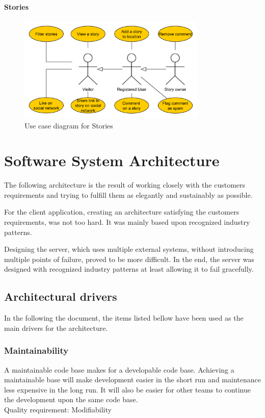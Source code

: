 \documentclass[11pt]{book}
\begin{document}
\subsubsection{Stories}
\begin{figure}[H]
      \centering
      \includegraphics[width=0.8\textwidth]{Figures/Requirements/story.pdf}
      \caption{Use case diagram for Stories}
      \label{fig:req_usecase_stories}
\end{figure}


\chapter{Software System Architecture}\label{chap:architecture}
The following architecture is the result of working closely with the customers requirements and trying to fulfill them as elegantly and sustainably as possible.

For the client application, creating an architecture satisfying the customers requirements, was not too hard. It was  mainly based upon recognized industry patterns.

Designing the server, which uses multiple external systems, without introducing multiple points of failure, proved to be more difficult. In the end, the server was designed with recognized industry patterns at least allowing it to fail gracefully.

\section{Architectural drivers} \label{sec:architecture_drivers}
In the following the document, the items listed bellow have been used as the main drivers for the architecture.

\subsection{Maintainability} 
A maintainable code base makes for a developable code base. Achieving a maintainable base will make development easier in the short run and maintenance less expensive in the long run. It will also be easier for other teams to continue the development upon the same code base.\\
Quality requirement: Modifiability
\end{document}
